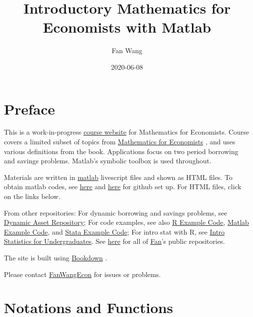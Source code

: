 \documentclass[
]{book}
\title{Introductory Mathematics for Economists with Matlab}
\author{Fan Wang}
\date{2020-06-08}
\begin{document}
\maketitle

{
\hypersetup{linkcolor=}
\setcounter{tocdepth}{1}
\tableofcontents
}
\hypertarget{preface}{%
\chapter*{Preface}\label{preface}}

This is a work-in-progress \href{https://fanwangecon.github.io/Math4Econ/}{course website} for Mathematics for Economists. Course covers a limited subset of topics from \href{Mathematics\%20for\%20Economists}{Mathematics for Economists} \citep{simonblume1994}, and uses various definitions from the book. Applications focus on two period borrowing and savings problems. Matlab's symbolic toolbox is used throughout.

Materials are written in \href{https://www.mathworks.com/products/matlab.html}{matlab} \citep{matlab} livescript files and shown as HTML files. To obtain matlab codes, see \href{docs/gitsetup.md}{here} and \href{docs/gitsetupown.md}{here} for github set up. For HTML files, click on the links below.

From other repositories: For dynamic borrowing and savings problems, see \href{https://fanwangecon.github.io/CodeDynaAsset/}{Dynamic Asset Repository}; For code examples, see also \href{https://fanwangecon.github.io/R4Econ/}{R Example Code}, \href{https://fanwangecon.github.io/M4Econ/}{Matlab Example Code}, and \href{https://fanwangecon.github.io/Stata4Econ/}{Stata Example Code}; For intro stat with R, see \href{https://fanwangecon.github.io/Stat4Econ/}{Intro Statistics for Undergraduates}. See \href{https://github.com/FanWangEcon}{here} for all of \href{https://fanwangecon.github.io/}{Fan}'s public repositories.

The site is built using \href{https://bookdown.org/}{Bookdown} \citep{R-bookdown}.

Please contact \href{https://fanwangecon.github.io/}{FanWangEcon} for issues or problems.

\hypertarget{notations-and-functions}{%
\chapter{Notations and Functions}\label{notations-and-functions}}
\end{document}
